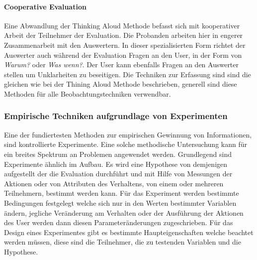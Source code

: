 \documentclass[draft=false
              ,paper=a4
              ,twoside=false
              ,fontsize=11pt
              ,headsepline
              ,BCOR10mm
              ,DIV11
              ]{scrbook}
\begin{document}
\paragraph{Cooperative Evaluation} %
\label{par:cooperative_evaluation}
Eine Abwandlung der Thinking Aloud Methode befasst sich mit kooperativer Arbeit der Teilnehmer der Evaluation. Die Probanden arbeiten hier in engerer Zusammenarbeit mit den Auswertern. In dieser spezialisierten Form richtet der Auswerter auch während der Evaluation Fragen an den User, in der Form von \textit{Warum?} oder \textit{Was wenn?}. Der User kann ebenfalls Fragen an den Auswerter stellen um Unklarheiten zu beseitigen. Die Techniken zur Erfassung sind sind die gleichen wie bei der Thining Aloud Methode beschrieben, generell sind diese Methoden für alle Beobachtungstechniken verwendbar.
\subsubsection{Empirische Techniken aufgrundlage von Experimenten} %
\label{ssub:empirische_techniken_auf_grundlage_von_experimenten}
Eine der fundiertesten Methoden zur empirischen Gewinnung von Informationen, sind kontrollierte Experimente. Eine solche methodische Untersuchung kann für ein breites Spektrum an Problemen angewendet werden. Grundlegend sind Experimente ähnlich im Aufbau. Es wird eine Hypothese von demjenigen aufgestellt der die Evaluation durchführt und mit Hilfe von Messungen der Aktionen oder von Attributen des Verhaltens, von einem oder mehreren Teilnehmern, bestimmt werden kann. Für das Experiment werden bestimmte Bedingungen festgelegt welche sich nur in den Werten bestimmter Variablen ändern, jegliche Veränderung am Verhalten oder der Ausführung der Aktionen des User werden dann diesen Parameteränderungen zugeschrieben. Für das Design eines Experimentes gibt es bestimmte Haupteigenschaften welche beachtet werden müssen, diese sind die Teilnehmer, die zu testenden Variablen und die Hypothese.
\end{document}
